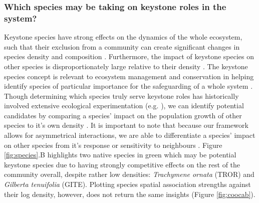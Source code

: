 \documentclass[a4,12pt]{article}
\begin{document}
    \subsubsection*{Which species may be taking on keystone roles in the system?}
    Keystone species have strong effects on the dynamics of the whole ecosystem, such that their exclusion from a community can create significant changes in species density and composition \parencite{Paine1969}. Furthermore, the impact of keystone species on other species is disproportionately large relative to their density \parencite{Power1996, Piraino2002, Libralato2006}. The keystone species concept is  relevant to ecosystem management and conservation in helping identify species of particular importance for the safeguarding of a whole system \parencite{Soule2005a}. Though determining which species truly serve keystone roles has historically involved extensive ecological experimentation (e.g. \cite{Paine1992}), we can identify potential candidates by comparing a species' impact on the population growth of other species to it's own density \parencite{Libralato2006}. It is important to note that because our framework allows for asymmetrical interactions, we are able to differentiate a species' impact on other species from it's response or sensitivity to neighbours \parencite{Broekman2020}. Figure \ref{fig:species}.B highlights two native species in green which may be potential keystone species due to having strongly competitive effects on the rest of the community overall, despite rather low densities: \textit{Trachymene ornata} (TROR) and \textit{Gilberta tenuifolia} (GITE). Plotting species spatial association strengths against their log density, however, does not return the same insights (Figure \ref{fig:coocab}).
    
\end{document}
